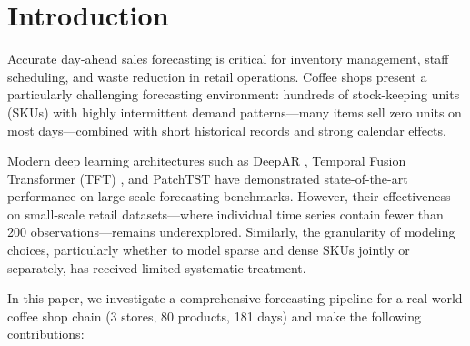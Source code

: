 \documentclass[review,authoryear]{elsarticle}
\begin{document}
\linenumbers

\section{Introduction}

Accurate day-ahead sales forecasting is critical for inventory management, staff scheduling, and waste reduction in retail operations. Coffee shops present a particularly challenging forecasting environment: hundreds of stock-keeping units (SKUs) with highly intermittent demand patterns---many items sell zero units on most days---combined with short historical records and strong calendar effects.

Modern deep learning architectures such as DeepAR \citep{salinas2020deepar}, Temporal Fusion Transformer (TFT) \citep{lim2021tft}, and PatchTST \citep{nie2023patchtst} have demonstrated state-of-the-art performance on large-scale forecasting benchmarks. However, their effectiveness on small-scale retail datasets---where individual time series contain fewer than 200 observations---remains underexplored. Similarly, the granularity of modeling choices, particularly whether to model sparse and dense SKUs jointly or separately, has received limited systematic treatment.

In this paper, we investigate a comprehensive forecasting pipeline for a real-world coffee shop chain (3 stores, 80 products, 181 days) and make the following contributions:
\end{document}
